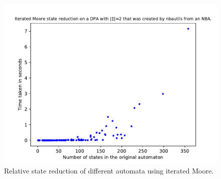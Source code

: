 \begin{figure}
\begin{minipage}{0.49\textwidth}
		\includegraphics[page=5,height=.3\textheight]{../data/analysis/iterated_moore/detnbaut_ap1.pdf} 
		\caption{Relative state reduction of different automata using iterated Moore.}
		\label{exp:fig:iterated_moore_reduct_prios}
	\end{minipage}
\end{figure}

